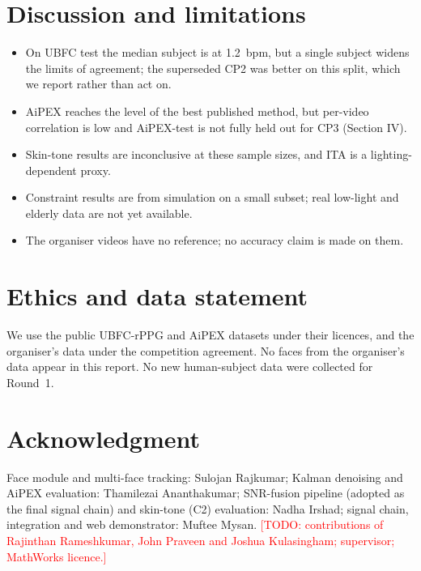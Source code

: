 \documentclass[conference]{IEEEtran}
\newcommand{\todo}[1]{\textcolor{red}{[TODO: #1]}}
\begin{document}
\section{Discussion and limitations}
\begin{itemize}
  \item On UBFC test the median subject is at \SI{1.2}{bpm}, but a single subject widens the limits of agreement; the
        superseded CP2 was better on this split, which we report rather than act on.
  \item AiPEX reaches the level of the best published method, but per-video correlation is low and AiPEX-test is not fully
        held out for CP3 (Section IV).
  \item Skin-tone results are inconclusive at these sample sizes, and ITA is a lighting-dependent proxy.
  \item Constraint results are from simulation on a small subset; real low-light and elderly data are not yet available.
  \item The organiser videos have no reference; no accuracy claim is made on them.
\end{itemize}

\section{Ethics and data statement}
We use the public UBFC-rPPG and AiPEX datasets under their licences, and the organiser's data under the competition
agreement. No faces from the organiser's data appear in this report. No new human-subject data were collected for Round~1.

\section*{Acknowledgment}
Face module and multi-face tracking: Sulojan Rajkumar; Kalman denoising and AiPEX evaluation: Thamilezai Ananthakumar;
SNR-fusion pipeline (adopted as the final signal chain) and skin-tone (C2) evaluation: Nadha Irshad; signal chain,
integration and web demonstrator: Muftee Mysan. \todo{contributions of Rajinthan Rameshkumar, John Praveen and Joshua
Kulasingham; supervisor; MathWorks licence.}



\end{document}

